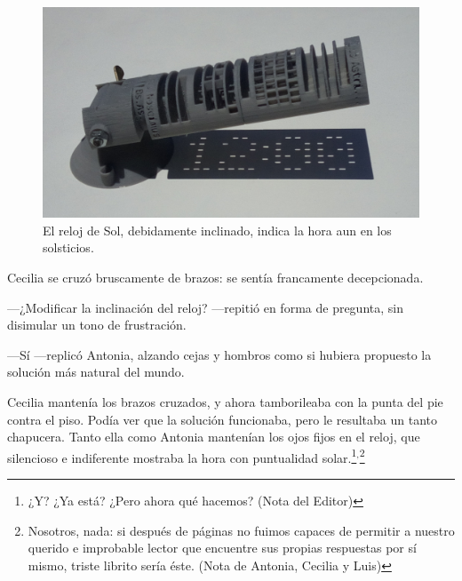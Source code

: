 \begin{figure}[ht]
  \centering
  \includegraphics[width=.7\textwidth]{imagenes/reloj-solsticio-bien}
  \caption{El reloj de Sol, debidamente inclinado, indica la
    hora aun en los solsticios.}%
  \label{fig:reloj-solsticio-bien}
\end{figure}

Cecilia se cruzó bruscamente de brazos: se sentía francamente
decepcionada.

---¿Modificar la inclinación del reloj? ---repitió en forma de
pregunta, sin disimular un tono de frustración.

---Sí ---replicó Antonia, alzando cejas y hombros como si hubiera
propuesto la solución más natural del mundo.

Cecilia mantenía los brazos cruzados, y ahora tamborileaba con la
punta del pie contra el piso. Podía ver que la solución funcionaba,
pero le resultaba un tanto chapucera. Tanto ella como Antonia
mantenían los ojos fijos en el reloj, que silencioso e indiferente
mostraba la hora con puntualidad solar.\footnote{¿Y? ¿Ya está?  ¿Pero
  ahora qué hacemos? (Nota del Editor)}$^,$\footnote{Nosotros, nada:
  si después de \pageref{sec:final_apendice} páginas no fuimos capaces
  de permitir a nuestro querido e improbable lector que encuentre sus
  propias respuestas por sí mismo, triste librito sería éste. (Nota de
  Antonia, Cecilia y Luis)}\label{sec:final_apendice}






